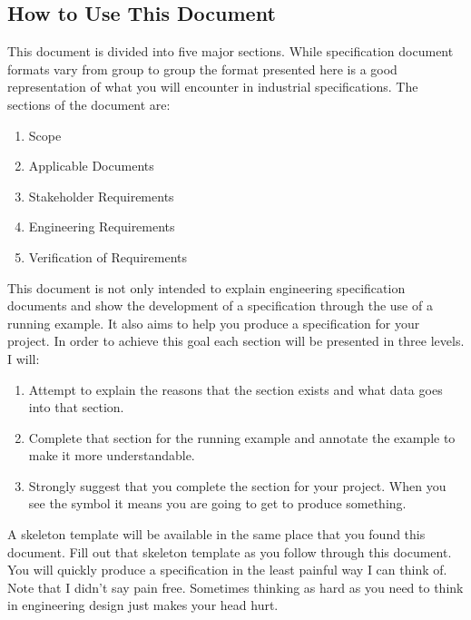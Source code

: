 \begin{slshape}
\color{blue}
\section*{How to Use This Document}

This document is divided into five major sections.  While specification document formats vary from group to group the format presented here is a good representation of what you will encounter in industrial specifications.  The sections of the document are:

\begin{enumerate}
	\item Scope
	\item Applicable Documents
	\item Stakeholder Requirements
	\item Engineering Requirements
	\item Verification of Requirements
\end{enumerate}

This document is not only intended to explain engineering specification documents and show the development of a specification through the use of a running example.  It also aims to help you produce a specification for your project.  In order to achieve this goal each section will be presented in three levels.  I will:

\begin{enumerate}
	\item Attempt to explain the reasons that the section exists and what data goes into that section.
	\item Complete that section for the running example and annotate the example to make it more understandable.
	\item Strongly suggest that you complete the section for your project.  When you see the symbol\vspace{.5cm} \StopSign\vspace{.5cm} it means you are going to get to produce something.
\end{enumerate} 


A skeleton template will be available in the same place that you found this document.  Fill out that skeleton template as you follow through this document.  You will quickly produce a specification in the least painful way I can think of.  Note that I didn't say pain free.  Sometimes thinking as hard as you need to think in engineering design just makes your head hurt.  


\end{slshape}

